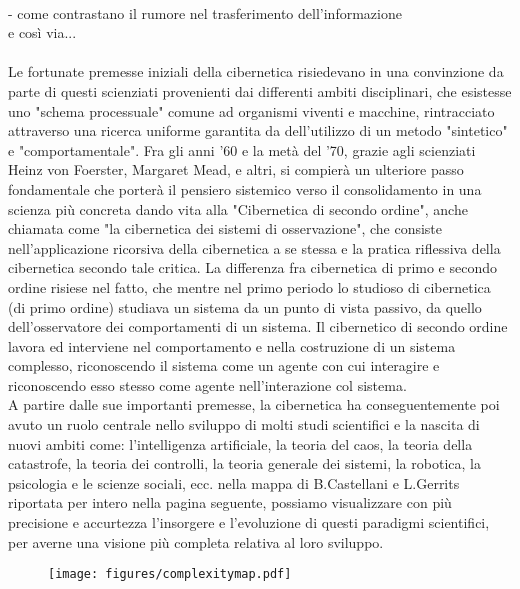 \\
- come contrastano il rumore nel trasferimento dell'informazione
\\
  e così via...
\\ \\
Le fortunate premesse iniziali della cibernetica risiedevano in una convinzione
da parte di questi scienziati provenienti dai differenti ambiti disciplinari,
che esistesse uno "schema processuale" comune ad organismi viventi e macchine,
rintracciato attraverso una ricerca uniforme garantita da dell'utilizzo di un metodo
"sintetico" e "comportamentale".
Fra gli anni '60 e la metà del '70, grazie agli scienziati
Heinz von Foerster, Margaret Mead, e altri,
si compierà un ulteriore passo fondamentale che porterà
il pensiero sistemico verso il consolidamento in una scienza più concreta
dando vita alla "Cibernetica di secondo ordine",
anche chiamata come "la cibernetica dei sistemi di osservazione",
che consiste nell'applicazione
ricorsiva della cibernetica a se stessa e la pratica riflessiva della cibernetica
secondo tale critica.
La differenza fra cibernetica di primo e secondo ordine risiese nel fatto,
che mentre nel primo periodo lo studioso di cibernetica (di primo ordine)
studiava un sistema da un punto di vista passivo, da quello dell'osservatore
dei comportamenti di un sistema.
Il  cibernetico di secondo ordine lavora ed interviene nel comportamento
e nella costruzione di un sistema complesso,
riconoscendo il sistema come un agente con cui interagire e
riconoscendo esso stesso come agente nell'interazione col sistema. \\
A partire dalle sue importanti premesse,
la cibernetica ha conseguentemente poi avuto un ruolo centrale nello sviluppo di
molti studi scientifici e la nascita
di nuovi ambiti come: l'intelligenza artificiale, la teoria del caos,
la teoria della catastrofe,
la teoria dei controlli, la teoria generale dei sistemi, la robotica,
la psicologia e le scienze sociali,
ecc.
nella mappa di B.Castellani e L.Gerrits riportata per intero nella pagina seguente,
possiamo visualizzare con più precisione e accurtezza
l'insorgere e l'evoluzione di questi paradigmi scientifici, per averne una
visione più completa relativa al loro sviluppo.

\clearpage

\begin{figure}[!h]
    \centering
    \texttt{[image: figures/complexitymap.pdf]}
    \label{fig:figure}
\end{figure}


